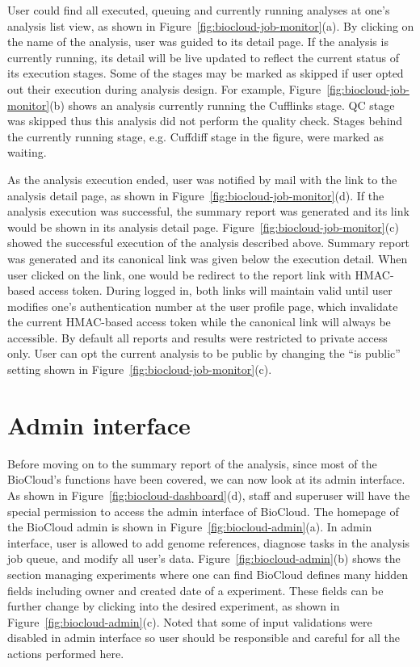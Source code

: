 User could find all executed, queuing and currently running analyses at one's
analysis list view, as shown in Figure~\ref{fig:biocloud-job-monitor}(a). By
clicking on the name of the analysis, user was guided to its detail page. If
the analysis is currently running, its detail will be live updated to reflect
the current status of its execution stages. Some of the stages may be marked as
skipped if user opted out their execution during analysis design. For example,
Figure~\ref{fig:biocloud-job-monitor}(b) shows an analysis currently running
the Cufflinks stage. QC stage was skipped thus this analysis did not perform
the quality check. Stages behind the currently running stage, e.g. Cuffdiff
stage in the figure, were marked as waiting.

As the analysis execution ended, user was notified by mail with the link to the
analysis detail page, as shown in Figure~\ref{fig:biocloud-job-monitor}(d). If
the analysis execution was successful, the summary report was generated and its
link would be shown in its analysis detail page.
Figure~\ref{fig:biocloud-job-monitor}(c) showed the successful execution of the
analysis described above. Summary report was generated and its canonical link
was given below the execution detail. When user clicked on the link, one would
be redirect to the report link with HMAC-based access token. During logged in,
both links will maintain valid until user modifies one's authentication number
at the user profile page, which invalidate the current HMAC-based access token
while the canonical link will always be accessible. By default all reports and
results were restricted to private access only. User can opt the current
analysis to be public by changing the ``is public'' setting shown in
Figure~\ref{fig:biocloud-job-monitor}(c).



\section{Admin interface}
\label{s:biocloud-admin}



Before moving on to the summary report of the analysis, since most of the
BioCloud's functions have been covered, we can now look at its admin interface.
As shown in Figure~\ref{fig:biocloud-dashboard}(d), staff and superuser will
have the special permission to access the admin interface of BioCloud. The
homepage of the BioCloud admin is shown in Figure~\ref{fig:biocloud-admin}(a).
In admin interface, user is allowed to add genome references, diagnose tasks in
the analysis job queue, and modify all user's data.
Figure~\ref{fig:biocloud-admin}(b) shows the section managing experiments where
one can find BioCloud defines many hidden fields including owner and created
date of a experiment. These fields can be further change by clicking into the
desired experiment, as shown in Figure~\ref{fig:biocloud-admin}(c). Noted that
some of input validations were disabled in admin interface so user should be
responsible and careful for all the actions performed here.



